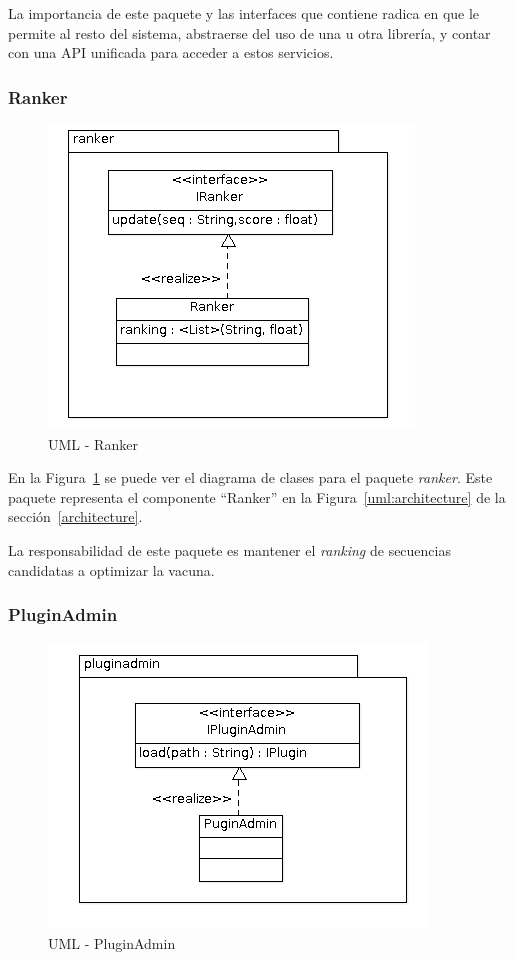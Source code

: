   La importancia de este paquete y las interfaces que contiene radica en que le
permite al resto del sistema, abstraerse del uso de una u otra librer\'ia, y
contar con una API unificada para acceder a estos servicios.    

  \subsubsection{Ranker}
  \begin{figure}
      \centering
      \includegraphics[scale=0.5]{lld-ranker.png}  
      \caption{UML - Ranker}
      \label{uml:lld-ranker}
    \end{figure}

  En la Figura~\ref{uml:lld-ranker} se puede ver el diagrama de clases
para el paquete \textit{ranker}. Este paquete representa el componente
``Ranker'' en la Figura~\ref{uml:architecture} de la
secci\'on~\ref{architecture}.

  La responsabilidad de este paquete es mantener el \textit{ranking} de
secuencias candidatas a optimizar la vacuna.

  \subsubsection{PluginAdmin}
  \begin{figure}
      \centering
      \includegraphics[scale=0.5]{lld-pluginadmin.png}  
      \caption{UML - PluginAdmin}
      \label{uml:lld-pluginadmin}
    \end{figure}

